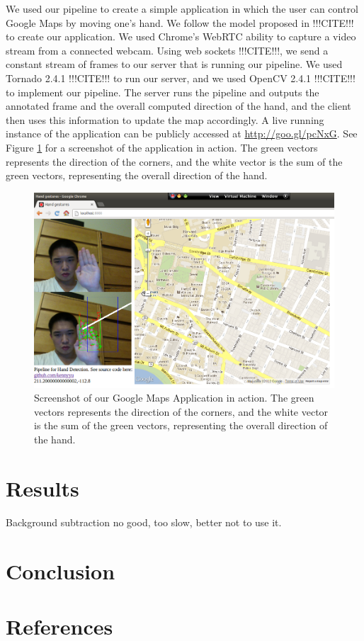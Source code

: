 \documentclass[12pt]{article}
\begin{document}
We used our pipeline to create a simple application in which the user can control Google Maps by moving one's hand. We follow the model proposed in !!!CITE!!! to create our application. We used Chrome's WebRTC ability to capture a video stream from a connected webcam. Using web sockets !!!CITE!!!, we send a constant stream of frames to our server that is running our pipeline. We used Tornado 2.4.1 !!!CITE!!! to run our server, and we used OpenCV 2.4.1 !!!CITE!!! to implement our pipeline. The server runs the pipeline and outputs the annotated frame and the overall computed direction of the hand, and the client then uses this information to update the map accordingly. A live running instance of the application can be publicly accessed at \url{http://goo.gl/pcNxG}. See Figure \ref{map} for a screenshot of the application in action. The green vectors represents the direction of the corners, and the white vector is the sum of the green vectors, representing the overall direction of the hand.

\noindent\begin{figure}[H]
\centering
\includegraphics[scale=0.45]{map.png}
\caption{Screenshot of our Google Maps Application in action. The green vectors represents the direction of the corners, and the white vector is the sum of the green vectors, representing the overall direction of the hand.}
\label{map}
\end{figure}

\section{Results}

Background subtraction no good, too slow, better not to use it. 

\section{Conclusion}

\section{References}
\end{document}
